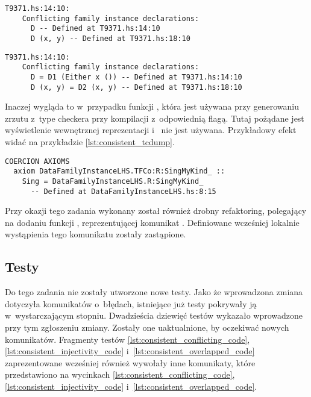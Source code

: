 \begin{lstlisting}[float,language={},label={lst:consistent_datafams_before},
                   caption={Błąd generowany przez kompilator w przypadku \ref{lst:consistent_datafams_before} przed wprowadzeniem zmian.}]
T9371.hs:14:10:
    Conflicting family instance declarations:
      D -- Defined at T9371.hs:14:10
      D (x, y) -- Defined at T9371.hs:18:10
\end{lstlisting}

\begin{lstlisting}[float,language={},label={lst:consistent_datafams_after},
                   caption={Błąd generowany przez kompilator w przypadku \ref{lst:consistent_datafams_after} przed wprowadzeniem zmian.}]
T9371.hs:14:10:
    Conflicting family instance declarations:
      D = D1 (Either x ()) -- Defined at T9371.hs:14:10
      D (x, y) = D2 (x, y) -- Defined at T9371.hs:18:10
\end{lstlisting}

Inaczej wygląda to w~przypadku funkcji , która jest używana
przy generowaniu zrzutu z~type checkera przy kompilacji z~odpowiednią
flagą. Tutaj pożądane jest wyświetlenie wewnętrznej reprezentacji
i~ nie jest używana. Przykładowy efekt widać na przykładzie
\ref{lst:consistent_tcdump}.

\begin{lstlisting}[float,language={},label={lst:consistent_tcdump},
                   caption={Fragment oczekiwanego zrzutu z type checkera testu DataFamilyInstanceLHS z wyświetlonym równaniem rodziny typów danych.}]
COERCION AXIOMS
  axiom DataFamilyInstanceLHS.TFCo:R:SingMyKind_ ::
    Sing = DataFamilyInstanceLHS.R:SingMyKind_
      -- Defined at DataFamilyInstanceLHS.hs:8:15
\end{lstlisting}

Przy okazji tego zadania wykonany został również drobny refaktoring,
polegający na dodaniu funkcji , reprezentującej komunikat .
Definiowane wcześniej lokalnie wystąpienia tego komunikatu zostały zastąpione.

\subsection{Testy} %

Do tego zadania nie zostały utworzone nowe testy. Jako że wprowadzona zmiana
dotyczyła komunikatów o~błędach, istniejące już testy pokrywały ją
w~wystarczającym stopniu. Dwadzieścia dziewięć testów wykazało wprowadzone przy
tym zgłoszeniu zmiany. Zostały one uaktualnione, by oczekiwać nowych
komunikatów. Fragmenty testów \ref{lst:consistent_conflicting_code},
\ref{lst:consistent_injectivity_code} i~\ref{lst:consistent_overlapped_code}
zaprezentowane wcześniej również wywołały inne komunikaty, które przedstawiono
na wycinkach \ref{lst:consistent_conflicting_code},
\ref{lst:consistent_injectivity_code} i~\ref{lst:consistent_overlapped_code}.

